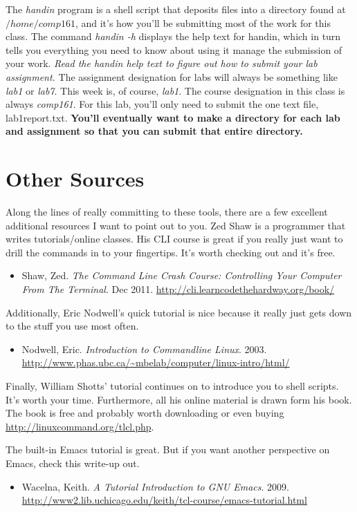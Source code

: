 \documentclass[]{tufte-handout}
\begin{document}
The \textit{handin} program is a shell script that deposits files into a directory found at $ /home/comp161$, and it's how you'll be submitting most of the work for this class. The command \textit{handin -h} displays the help text for handin, which in turn tells you everything you need to know about using it manage the submission of your work. \textit{Read the handin help text to figure out how to submit your lab assignment.} The assignment designation for labs will always be something like \textit{lab1} or \textit{lab7}.  This week is, of course, \textit{lab1}.  The course designation in this class is always \textit{comp161}.  For this lab, you'll only need to submit the one text file, lab1report.txt.  \textbf{You'll eventually want to make a directory for each lab and assignment so that you can submit that entire directory.}

\section{Other Sources}

Along the lines of really committing to these tools, there are a few excellent additional resources I want to point out to you. Zed Shaw is a programmer that writes tutorials/online classes.  His CLI course is great if you really just want to drill the commands in to your fingertips.  It's worth checking out and it's free.
\begin{itemize}
\item Shaw, Zed. \textit{The Command Line Crash Course: Controlling Your Computer From The Terminal}. Dec 2011. \url{http://cli.learncodethehardway.org/book/}
\end{itemize}
Additionally, Eric Nodwell's quick tutorial is nice because it really just gets down to the stuff you use most often.
\begin{itemize}
\item Nodwell, Eric. \textit{Introduction to Commandline Linux}. 2003. \url{http://www.phas.ubc.ca/~mbelab/computer/linux-intro/html/}
\end{itemize}
Finally, William Shotts' tutorial continues on to introduce you to shell scripts. It's worth your time.  Furthermore, all his online material is drawn form his book.  The book is free and probably worth downloading or even buying \url{http://linuxcommand.org/tlcl.php}.

The built-in Emacs tutorial is great. But if you want another perspective on Emacs, check this write-up out.
\begin{itemize}
\item Wacelna, Keith. \textit{A Tutorial Introduction to GNU Emacs}. 2009. \url{http://www2.lib.uchicago.edu/keith/tcl-course/emacs-tutorial.html}
\end{itemize}
\end{document}

